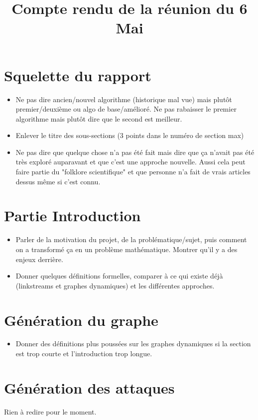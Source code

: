 \documentclass{article}
\title{Compte rendu de la réunion du 6 Mai}
\date{}
\begin{document}
	
\maketitle
	
\section*{Squelette du rapport}
	\begin{itemize}
		\item Ne pas dire ancien/nouvel algorithme (historique mal vue) mais plutôt premier/deuxième ou algo de base/amélioré. Ne pas rabaisser le premier algorithme mais plutôt dire que le second est meilleur.
		\item Enlever le titre des sous-sections (3 points dans le numéro de section max)
		\item Ne pas dire que quelque chose n'a pas été fait mais dire que ça n'avait pas été très exploré auparavant et que c'est une approche nouvelle. Aussi cela peut faire partie du "folklore scientifique" et que personne n'a fait de vrais articles dessus même si c'est connu.
	\end{itemize}

\section*{Partie Introduction}
	\begin{itemize}
		\item Parler de la motivation du projet, de la problématique/sujet, puis comment on a transformé ça en un problème mathématique. Montrer qu'il y a des enjeux derrière.
		\item Donner quelques définitions formelles, comparer à ce qui existe déjà (linkstreams et graphes dynamiques) et les différentes approches.
	\end{itemize}

\section*{Génération du graphe}
	\begin{itemize}
		\item Donner des définitions plus poussées sur les graphes dynamiques si la section est trop courte et l'introduction trop longue.
	\end{itemize}

\section*{Génération des attaques}
	Rien à redire pour le moment.
\end{document}
